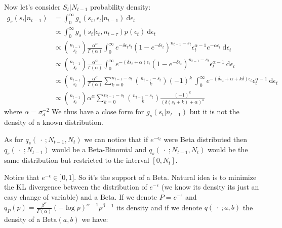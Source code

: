 \documentclass{article}
\begin{document}
	Now let's consider $S_t | N_{t-1}$ probability density:
	\begin{equation*}
	\begin{split}
	g_s(s_t | n_{t-1}) & = \int_{0}^{\infty}g_s(s_t, \epsilon_t | n_{t-1})\ \mathrm{d}\epsilon_t \\
	& \propto \int_{0}^{\infty}g_s(s_t | \epsilon_t, n_{t-\tau})p(\epsilon_t)\ \mathrm{d}\epsilon_t \\
	& \propto \binom{n_{t-1}}{s_t}\frac{\alpha^\alpha}{\Gamma(\alpha)} \int_{0}^{\infty}e^{-\delta\epsilon_t s_t}(1-e^{-\delta\epsilon_t})^{n_{t-1}-s_t}\epsilon_t^{\alpha-1}e^{-\alpha\epsilon_t}\ \mathrm{d}\epsilon_t \\
	& \propto \binom{n_{t-1}}{s_t}\frac{\alpha^\alpha}{\Gamma(\alpha)}\int_{0}^{\infty}e^{-(\delta s_t+\alpha)\epsilon_t }(1-e^{-\delta\epsilon_t})^{n_{t-1}-s_t}\epsilon_t^{\alpha-1}\ \mathrm{d}\epsilon_t \\
	& \propto \binom{n_{t-1}}{s_t}\frac{\alpha^\alpha}{\Gamma(\alpha)}\sum_{k=0}^{n_{t-1}-s_t}\binom{n_{t-1}-s_t}{k}(-1)^k \ \int_{0}^{\infty}e^{-(\delta s_t+\alpha + k\delta)\epsilon_t }\epsilon_t^{\alpha-1}\ \mathrm{d}\epsilon_t \\
	& \propto \binom{n_{t-1}}{s_t}\alpha^\alpha\sum_{k=0}^{n_{t-1}-s_t}\binom{n_{t-1}-s_t}{k}\frac{(-1)^k}{(\delta(s_t+k)+\alpha)^\alpha}
	\end{split}
	\end{equation*}
	where $\alpha = \sigma_d^{-2}$
	We thus have a close form for $g_s(s_t | n_{t-1})$ but it is not the density of a known distribution.
	
	As for $q_s(\ \cdot \ ; N_{t-1}, N_t)$ we can notice that if $e^{-\epsilon_t}$ were Beta distributed then $q_s(\ \cdot \ ; N_{t-1})$ would be a Beta-Binomial and $q_s(\ \cdot \ ; N_{t-1}, N_t)$ would be the same distribution but restricted to the interval $[0, N_t]$. 
	
Notice that $e^{-\epsilon} \in ]0, 1]$. So it's the support of a Beta. Natural idea is to minimize the KL divergence between the distribution of $e^{-\epsilon}$ (we know its density its just an easy change of variable) and a Beta. 
If we denote $P=e^{-\epsilon}$ and $q_P(p)=\frac{\beta^\alpha}{\Gamma(\alpha)}(-\log p)^{\alpha-1}p^{\beta-1}$ its density and if we denote $q(\ \cdot \ ; a, b)$ the density of a $\mathrm{Beta}(a,b)$ we have:
\end{document}
